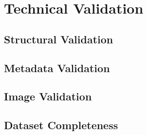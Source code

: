 \section{Technical Validation}
\label{sec:technical_validation}

\subsection{Structural Validation}



\subsection{Metadata Validation}



\subsection{Image Validation}



\subsection{Dataset Completeness}



